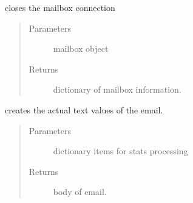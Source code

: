 \documentclass[letterpaper,10pt,english]{sphinxmanual}
\begin{document}
\begin{fulllineitems}
\label{\detokenize{index:ListManagement.utility.email_helper.close_mailbox_connection}}
closes the mailbox connection
\begin{quote}\begin{description}
\item[{Parameters}] \leavevmode
{} \textendash{} mailbox object

\item[{Returns}] \leavevmode
dictionary of mailbox information.

\end{description}\end{quote}

\end{fulllineitems}


\begin{fulllineitems}
\label{\detokenize{index:ListManagement.utility.email_helper.craft_notification_email}}
creates the actual text values of the email.
\begin{quote}\begin{description}
\item[{Parameters}] \leavevmode
{} \textendash{} dictionary items for stats processing

\item[{Returns}] \leavevmode
body of email.

\end{description}\end{quote}

\end{fulllineitems}


\begin{fulllineitems}
\label{\detokenize{index:ListManagement.utility.email_helper.determine_id_and_object_from_link}}
\end{fulllineitems}
\end{document}
